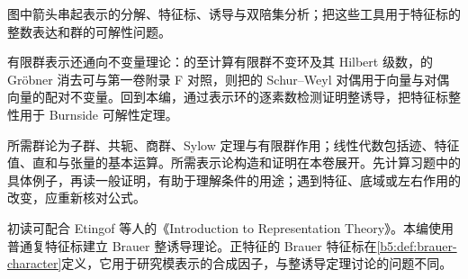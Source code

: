 图中箭头串起表示的分解、特征标、诱导与双陪集分析；把这些工具用于特征标的整数表达和群的可解性问题。

\ProseParagraphBreak
有限群表示还通向不变量理论：的至计算有限群不变环及其 Hilbert 级数，的 Gröbner 消去可与第一卷附录 F 对照，则把的 Schur--Weyl 对偶用于向量与对偶向量的配对不变量。回到本编，通过表示环的逐素数检测证明整诱导，把特征标整性用于 Burnside 可解性定理。

\ProseParagraphBreak
所需群论为子群、共轭、商群、Sylow 定理与有限群作用；线性代数包括迹、特征值、直和与张量的基本运算。所需表示论构造和证明在本卷展开。先计算习题中的具体例子，再读一般证明，有助于理解条件的用途；遇到特征、底域或左右作用的改变，应重新核对公式。

\ProseParagraphBreak
初读可配合 Etingof 等人的《Introduction to Representation Theory》\cite[Chapters 4--5]{EtingofEtAl2011RepresentationTheory}。本编使用普通复特征标建立 Brauer 整诱导理论。正特征的 Brauer 特征标在\cref{b5:def:brauer-character}定义，它用于研究模表示的合成因子，与整诱导定理讨论的问题不同。






